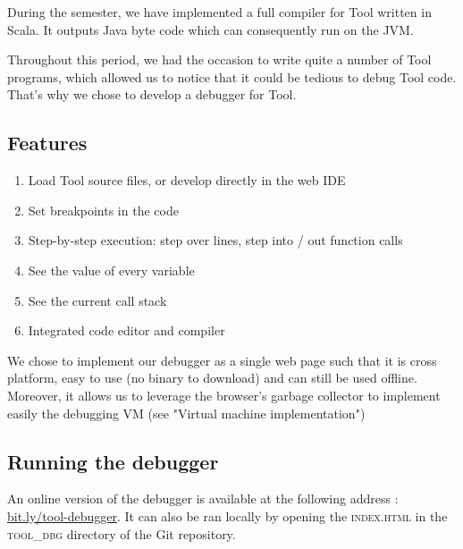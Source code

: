 During the semester, we have implemented a full compiler for Tool written in Scala. It outputs Java byte code which can consequently run on the JVM.

Throughout this period, we had the occasion to write quite a number of Tool programs, which allowed us to notice that it could be tedious to debug Tool code. That's why we chose to develop a debugger for Tool.

\subsection{Features}

\begin{enumerate}
\item Load Tool source files, or develop directly in the web IDE
\item Set breakpoints in the code
\item Step-by-step execution: step over lines, step into / out function calls
\item See the value of every variable
\item See the current call stack
\item Integrated code editor and compiler
\end{enumerate}

We chose to implement our debugger as a single web page such that it is cross platform, easy to use (no binary to download) and can still be used offline. Moreover, it allows us to leverage the browser's garbage collector to implement easily the debugging VM (see "Virtual machine implementation")

\subsection{Running the debugger}

An online version of the debugger is available at the following address : \href{http://bit.ly/tool-debugger}{bit.ly/tool-debugger}. It can also be ran locally by opening the \textsc{index.html} in the \textsc{tool\_dbg} directory of the Git repository.






